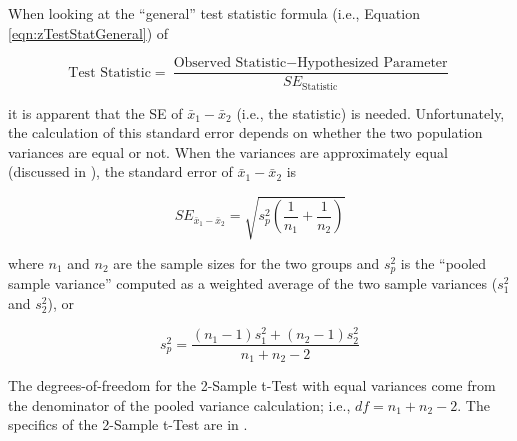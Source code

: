 \documentclass[10pt,openany]{book}\usepackage[]{graphicx}\usepackage[]{color}
\begin{document}
When looking at the ``general'' test statistic formula (i.e., Equation \eqref{eqn:zTestStatGeneral}) of

\vspace*{-6pt}
\[ \text{Test Statistic} = \frac{\text{Observed Statistic}-\text{Hypothesized Parameter}}{SE_{\text{Statistic}}} \]
\vspace*{-6pt}

it is apparent that the SE of $\bar{x}_{1}-\bar{x}_{2}$ (i.e., the statistic) is needed. Unfortunately, the calculation of this standard error depends on whether the two population variances are equal or not. When the variances are approximately equal (discussed in ), the standard error of $\bar{x}_{1}-\bar{x}_{2}$ is

\[ SE_{\bar{x}_{1}-\bar{x}_{2}}= \sqrt{s_{p}^{2}\left(\frac{1}{n_{1}}+\frac{1}{n_{2}} \right)}  \]

where $n_{1}$ and $n_{2}$ are the sample sizes for the two groups and $s_{p}^{2}$ is the ``pooled sample variance'' computed as a weighted average of the two sample variances ($s_{1}^{2}$ and $s_{2}^{2}$), or

\[s_{p}^{2}=\frac{(n_{1}-1)s_{1}^{2}+(n_{2}-1)s_{2}^{2}}{n_{1}+n_{2}-2} \]

The degrees-of-freedom for the 2-Sample t-Test with equal variances come from the denominator of the pooled variance calculation; i.e., $df=n_{1}+n_{2}-2$. The specifics of the 2-Sample t-Test are in .
\end{document}
